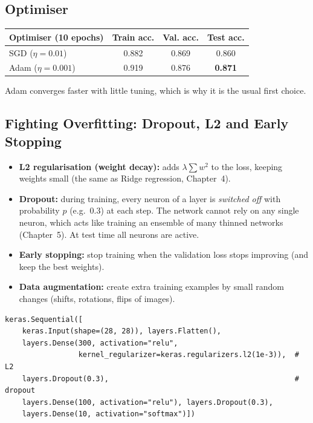 \subsection{Optimiser}

\begin{center}
\begin{tabular}{@{}lccc@{}}
\toprule
\textbf{Optimiser (10 epochs)} & \textbf{Train acc.} & \textbf{Val. acc.} & \textbf{Test acc.}\\
\midrule
SGD ($\eta=0.01$) & 0.882 & 0.869 & 0.860\\
Adam ($\eta=0.001$) & 0.919 & 0.876 & \textbf{0.871}\\
\bottomrule
\end{tabular}
\end{center}

\noindent Adam converges faster with little tuning, which is why it is the usual first choice.

\subsection{Fighting Overfitting: Dropout, L2 and Early Stopping}

\begin{definition}
\begin{itemize}
  \item \textbf{L2 regularisation (weight decay):} adds $\lambda\sum w^2$ to the loss, keeping weights small (the same as Ridge regression, Chapter~4).
  \item \textbf{Dropout:} during training, every neuron of a layer is \emph{switched off} with probability $p$ (e.g.\ $0.3$) at each step. The network cannot rely on any single neuron, which acts like training an ensemble of many thinned networks (Chapter~5). At test time all neurons are active.
  \item \textbf{Early stopping:} stop training when the validation loss stops improving (and keep the best weights).
  \item \textbf{Data augmentation:} create extra training examples by small random changes (shifts, rotations, flips of images).
\end{itemize}
\end{definition}

\begin{lstlisting}
keras.Sequential([
    keras.Input(shape=(28, 28)), layers.Flatten(),
    layers.Dense(300, activation="relu",
                 kernel_regularizer=keras.regularizers.l2(1e-3)),  # L2
    layers.Dropout(0.3),                                           # dropout
    layers.Dense(100, activation="relu"), layers.Dropout(0.3),
    layers.Dense(10, activation="softmax")])
\end{lstlisting}

